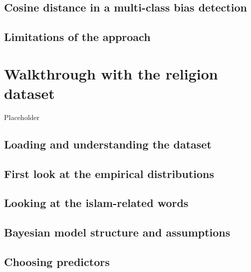 \documentclass[
  12pt,
]{book}
\begin{document}
\hypertarget{cosine-distance-in-a-multi-class-bias-detection}{%
\section{Cosine distance in a multi-class bias detection}\label{cosine-distance-in-a-multi-class-bias-detection}}

\hypertarget{limitations-of-the-approach}{%
\section{Limitations of the approach}\label{limitations-of-the-approach}}

\hypertarget{walkthrough-with-the-religion-dataset}{%
\chapter{Walkthrough with the religion dataset}\label{walkthrough-with-the-religion-dataset}}

Placeholder

\hypertarget{loading-and-understanding-the-dataset}{%
\section{Loading and understanding the dataset}\label{loading-and-understanding-the-dataset}}

\hypertarget{first-look-at-the-empirical-distributions}{%
\section{First look at the empirical distributions}\label{first-look-at-the-empirical-distributions}}

\hypertarget{looking-at-the-islam-related-words}{%
\section{Looking at the islam-related words}\label{looking-at-the-islam-related-words}}

\hypertarget{bayesian-model-structure-and-assumptions}{%
\section{Bayesian model structure and assumptions}\label{bayesian-model-structure-and-assumptions}}

\hypertarget{choosing-predictors}{%
\section{Choosing predictors}\label{choosing-predictors}}
\end{document}
